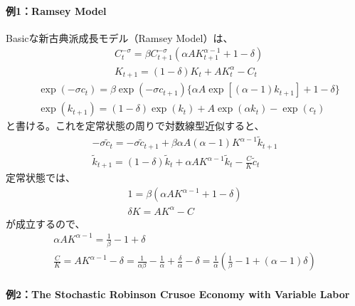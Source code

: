 \documentclass[a4j, dvipdfmx]{jarticle}
\begin{document}
\paragraph{例1：Ramsey Model}
Basicな新古典派成長モデル（Ramsey Model）は、
\begin{align}
&C_t^{-\sigma} = \beta C_{t+1}^{-\sigma} (\alpha A K_{t+1}^{\alpha-1} + 1 -\delta)\\
&K_{t+1} = (1-\delta) K_t + A K_t^\alpha - C_t
\end{align}
\begin{align}
&\exp(-\sigma c_t) = \beta \exp(-\sigma c_{t+1}) \{\alpha A \exp[(\alpha -1) k_{t+1}] + 1 -\delta\}\\
&\exp(k_{t+1}) = (1-\delta) \exp(k_t) + A\exp(\alpha k_t) - \exp(c_t)
\end{align}
と書ける。これを定常状態の周りで対数線型近似すると、
\begin{align}
-\sigma \tilde c_t = -\sigma  \tilde c_{t+1} + \beta \alpha A (\alpha -1) K^{\alpha -1} \tilde k_{t+1}\\
\tilde k_{t+1} = (1-\delta) \tilde k_t + \alpha A K^{\alpha -1} \tilde k_t - \frac{C}{K} \tilde c_t
\end{align}
定常状態では、
\begin{align}
1 = \beta (\alpha A K^{\alpha -1} + 1 - \delta)\\
\delta K = AK^\alpha - C
\end{align}
が成立するので、
\begin{align}
\alpha A K^{\alpha -1} = \frac{1}{\beta} - 1 + \delta \\
\frac{C}{K} = AK^{\alpha -1} -\delta = \frac{1}{\alpha\beta} - \frac{1}{\alpha} + \frac{\delta}{\alpha} - \delta = \frac{1}{\alpha}\left(\frac{1}{\beta} -1 + (\alpha -1)\delta\right)
\end{align}

\paragraph{例2：The Stochastic Robinson Crusoe Economy with Variable Labor}~
\end{document}
